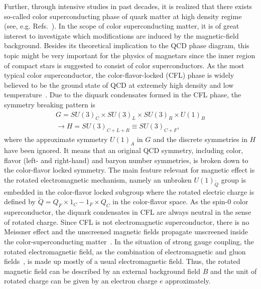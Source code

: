 \documentclass[prd, showpacs,nofootinbib,amsmath,amssymb]{revtex4}
\begin{document}
Further, through intensive studies in past decades, it is realized that there exists so-called color
superconducting phase of quark matter at high density regime (see, e.g.
Refs.~\cite{alford2004dense,buballa2005njl}). In the scope of color superconducting matter, it is of
great interest to investigate which modifications are induced by the magnetic-field background.
Besides its theoretical implication to the QCD phase diagram, this topic might be very important for the physics of magnetars since 
the inner region of compact stars is suggested to consist of color superconductors.
As the most typical color superconductor, the color-flavor-locked (CFL) phase is widely believed to be
the ground state of QCD at extremely high density and low temperature~\cite{alford1998qcd}. Due to the
diquark condensates formed in the CFL phase, the symmetry breaking pattern is
\begin{eqnarray}
G=SU(3)_{C}\times SU(3)_{L} \nonumber
\times SU(3)_{R}\times U(1)_{B} \\
\rightarrow H=SU(3)_{C+L+R}\equiv SU(3)_{C+F},\label{cfl}
\end{eqnarray}
where the approximate symmetry $U(1)_{A}$ in $G$ and the discrete symmetries in $H$ have been ignored.
It means that an original QCD symmetry, including color, flavor (left- and right-hand) and baryon number
symmetries, is broken down to the color-flavor locked symmetry.
The main feature relevant for magnetic effect is the rotated electromagnetic mechanism, namely an unbroken
$U(1)_{\widetilde{Q}}$ group is embedded in the color-flavor locked subgroup where the rotated electric
charge is defined by $\widetilde{Q}=Q_{F}\times {1}_{C}-{1}_{F}\times Q_{C}$ in the color-flavor space.
As the spin-$0$ color superconductor, the diquark condensates in CFL are always neutral in the sense of
rotated charge.
Since CFL is not electromagnetic superconductor, there is no Meissner effect and the unscreened magnetic
fields propagate unscreened inside the color-superconducting matter~\cite{alford1998qcd,alford2000magnetic}.
In the situation of strong gauge coupling, the rotated electromagnetic field, as the combination of
electromagnetic and gluon fields~\cite{alford1998qcd,alford2000magnetic}, is made up mostly of a usual
electromagnetic field. Thus, the rotated magnetic field can be described by an external background field
$B$ and the unit of rotated charge can be given by an electron charge $e$ approximately.
\end{document}
